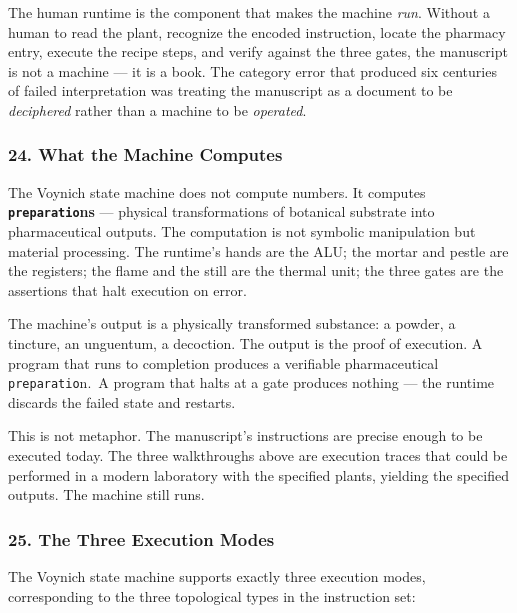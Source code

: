 \documentclass[12pt,a4paper]{article}
\begin{document}
The human runtime is the component that makes the machine \emph{run}.
Without a human to read the plant, recognize the encoded instruction,
locate the pharmacy entry, execute the recipe steps, and verify against
the three gates, the manuscript is not a machine --- it is a book. The
category error that produced six centuries of failed interpretation was
treating the manuscript as a document to be \emph{deciphered} rather
than a machine to be \emph{operated}.

\hypertarget{what-the-machine-computes}{%
\subsubsection{24. What the Machine
Computes}\label{what-the-machine-computes}}

The Voynich state machine does not compute numbers. It computes
\textbf{\texttt{preparatio}ns} --- physical transformations of botanical
substrate into pharmaceutical outputs. The computation is not symbolic
manipulation but material processing. The runtime's hands are the ALU;
the mortar and pestle are the registers; the flame and the still are the
thermal unit; the three gates are the assertions that halt execution on
error.

The machine's output is a physically transformed substance: a powder, a
tincture, an unguentum, a decoction. The output is the proof of
execution. A program that runs to completion produces a verifiable
pharmaceutical \texttt{preparatio}n.~A program that halts at a gate
produces nothing --- the runtime discards the failed state and restarts.

This is not metaphor. The manuscript's instructions are precise enough
to be executed today. The three walkthroughs above are execution traces
that could be performed in a modern laboratory with the specified
plants, yielding the specified outputs. The machine still runs.

\hypertarget{the-three-execution-modes}{%
\subsubsection{25. The Three Execution
Modes}\label{the-three-execution-modes}}

The Voynich state machine supports exactly three execution modes,
corresponding to the three topological types in the instruction set:
\end{document}
